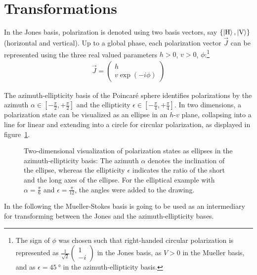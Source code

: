 \section*{Transformations}
In the Jones basis, polarization is denoted using two basis vectors, say $\{\Ket{\text{H}}, \Ket{\text{V}}\}$ (horizontal and vertical). Up to a global phase, each polarization vector $\vec J$ can be represented using the three real valued parameters $h > 0$, $v > 0$, $\phi$:\footnote[1]{The sign of $\phi$ was chosen such that right-handed circular polarization is represented as $\frac{1}{\sqrt{2}}\begin{pmatrix}1 \\ -i \end{pmatrix}$ in the Jones basis, as $V > 0$ in the Mueller basis, and as $\epsilon  = \SI{45}{\degree}$ in the azimuth-ellipticity basis.}
\begin{align}
    \vec J = \begin{pmatrix}h \\ v \exp(-i \phi)\end{pmatrix}
\end{align}

The azimuth-ellipticity basis of the Poincaré sphere identifies polarizations by the azimuth $\alpha \in \left[-\frac{\pi}{2}, +\frac{\pi}{2}\right]$ and the ellipticity $\epsilon \in \left[-\frac{\pi}{4}, +\frac{\pi}{4}\right]$. In two dimensions, a polarization state can be visualized as an ellipse in an $h$-$v$ plane, collapsing into a line for linear and extending into a circle for circular polarization, as displayed in figure~\ref{fig:azimuth_ellipticity_visualization}.

\begin{figure}
    \centering
    \scalebox{0.8}{
    \begin{pgfpicture}
        \pgftext{}
    \end{pgfpicture}
    }
    \caption{Two-dimensional visualization of polarization states as ellipses in the azimuth-ellipticity basis: The azimuth $\alpha$ denotes the inclination of the ellipse, whereas the ellipticity $\epsilon$ indicates the ratio of the short and the long axes of the ellipse. For the elliptical example with $\alpha = \frac{\pi}{6}$ and $\epsilon = \frac{\pi}{12}$, the angles were added to the drawing.}
    \label{fig:azimuth_ellipticity_visualization}
\end{figure}

In the following the Mueller-Stokes basis is going to be used as an intermediary for transforming between the Jones and the azimuth-ellipticity bases.

